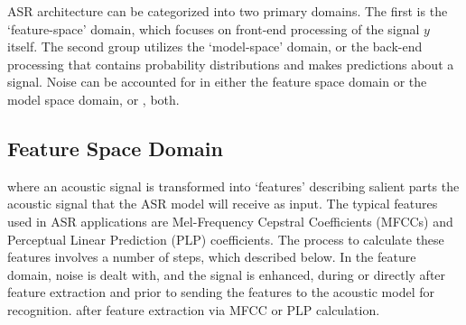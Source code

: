 ASR architecture can be categorized into two primary domains. The first is the `feature-space' domain, which focuses on front-end processing of the signal $y$ itself.  The second group utilizes the `model-space' domain, or the back-end processing that contains probability distributions and makes predictions about a signal. %
Noise can be accounted for in either the feature space domain or the model space domain, or \DIFdelbegin {}\DIFdelend \DIFaddbegin {}\DIFaddend , both.  %

\subsection{Feature Space Domain}

\DIFdelbegin {}\DIFdelend \DIFaddbegin {}\DIFaddend where an acoustic signal is transformed into `features' describing salient parts the acoustic signal that the ASR model will receive as input. The typical features used in ASR applications are Mel-Frequency Cepstral Coefficients (MFCCs) and Perceptual Linear Prediction (PLP) coefficients. The process to calculate these features involves a number of steps, which \DIFdelbegin {}\DIFdelend \DIFaddbegin {}\DIFaddend described below.  In the feature domain, noise is dealt with, and the signal is enhanced, during or directly after feature extraction and prior to sending the features to the acoustic model for recognition.  \DIFdelbegin {}\DIFdelend \DIFaddbegin {}\DIFaddend after feature extraction via MFCC or PLP calculation\DIFdelbegin {}\DIFdelend .

